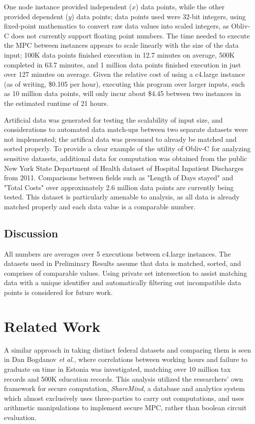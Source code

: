 \documentclass[conference]{IEEEtran}
\begin{document}
One node instance provided independent ($x$) data points, while the other provided 
dependent ($y$) data points; data points used were 32-bit integers, using fixed-point 
mathematics to convert raw data values into scaled integers, as 
Obliv-C does not currently support floating point numbers.
The time needed to execute the MPC between instances appears to scale linearly 
with the size of the data input; 100K data points finished execution in 12.7 minutes 
on average, 500K completed in 63.7 minutes, and 1 million data points finished execution 
in just over 127 minutes on average. Given the relative cost of using a c4.large instance
(as of writing, \$0.105 per hour), executing this program over larger inputs, such as
10 million data points, will only incur about \$4.45 between two instances in the 
estimated runtime of 21 hours.

Artificial data was generated for testing the scalability of input size, and
considerations to automated data match-ups between two separate datasets were not
implemented; the artifical data was presumed to already be matched and sorted properly.
To provide a clear example of the utility of Obliv-C for analyzing sensitive datasets, 
additional data for computation was obtained from the public New York State Department 
of Health dataset of Hospital Inpatient Discharges from 2011\cite{healthdata:ny}. 
Comparisons between fields such as "Length of Days stayed" and "Total Costs" 
over approximately 2.6 million data points are currently being tested.
This dataset is particularly amenable to analysis, as all data is already 
matched properly and each data value is a comparable number.

\subsection{Discussion}
All numbers are averages over 5 executions between c4.large instances. The datasets used in Preliminary Results assume that data is matched, sorted, and 
comprises of comparable values. Using private set intersection to assist matching 
data with a unique identifier and automatically filtering out incompatible 
data points is considered for future work.

\section{Related Work}
A similar approach in taking distinct federal datasets and comparing them is seen in
Dan Bogdanov \emph{et al.}, where correlations between working hours and failure to
graduate on time in Estonia was investigated, matching over 10 million 
tax records and 500K education records\cite{cryptoeprint:2015:1159}.
This analysis utilized the researchers' own framework for secure
computation, \emph{ShareMind}, a database and analytics system which 
almost exclusively uses three-parties to carry out computations, and uses arithmetic
manipulations to implement secure MPC, rather than boolean circuit evaluation\cite{sharemind}.
\end{document}
